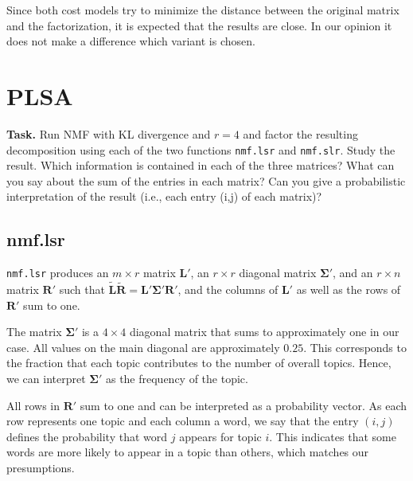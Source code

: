 \documentclass{support/acm_proc_article-sp}
\begin{document}
    Since both cost models try to minimize the distance between the original matrix and the factorization, it is expected
    that the results are close.
    In our opinion it does not make a difference which variant is chosen.


    \section{PLSA}

    \textbf{Task.} Run NMF with KL divergence and $r = 4$ and factor the resulting decomposition using each of the
    two functions \lstinline{nmf.lsr} and \lstinline{nmf.slr}.
    Study the result.
    Which information is contained in each of the three matrices?
    What can you say about the sum of the entries in each matrix?
    Can you give a probabilistic interpretation of the result (i.e.\@, each entry (i,j) of each matrix)?


    \subsection{nmf.lsr}
    \label{subsec:nmf-lsr}

    \lstinline{nmf.lsr} produces an $m \times r$ matrix $\mathbf{L'}$, an $r \times r$ diagonal matrix $\mathbf{\Sigma'}$,
    and an $r \times n$ matrix $\mathbf{R'}$ such that $\mathbf{\tilde{L}\tilde{R}} = \mathbf{L'}\mathbf{\Sigma'}\mathbf{R'}$,
    and the columns of $\mathbf{L'}$ as well as the rows of $\mathbf{R'}$ sum to one.

    The matrix $\mathbf{\Sigma'}$ is a $4 \times 4$ diagonal matrix that sums to approximately one in our case.
    All values on the main diagonal are approximately $0.25$.
    This corresponds to the fraction that each topic contributes to the number of overall topics.
    Hence, we can interpret $\mathbf{\Sigma'}$ as the frequency of the topic.

    All rows in $\mathbf{R'}$ sum to one and can be interpreted as a probability vector.
    As each row represents one topic and each column a word, we say that the entry $(i,j)$ defines the probability
    that word $j$ appears for topic $i$.
    This indicates that some words are more likely to appear in a topic than others, which matches our presumptions.
\end{document}
